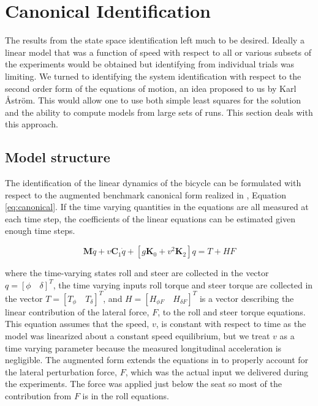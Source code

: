 \documentclass[a4paper]{article}
\begin{document}

\section{Canonical Identification}
\label{sec:canonical-identification}


The results from the state space identification left much to be desired.
Ideally a linear model that was a function of speed with respect to all or
various subsets of the experiments would be obtained but identifying from
individual trials was limiting. We turned to identifying the system
identification with respect to the second order form of the equations of
motion, an idea proposed to us by Karl Åström. This would allow one to use both
simple least squares for the solution and the ability to compute models from
large sets of runs. This section deals with this approach.

\subsection{Model structure}

The identification of the linear dynamics of the bicycle can be formulated with
respect to the augmented benchmark canonical form realized in
\cite{Meijaard2007}, Equation \ref{eq:canonical}. If the time varying
quantities in the equations are all measured at each time step, the
coefficients of the linear equations can be estimated given enough time steps.

\begin{equation}
  \mathbf{M} \ddot{q} + v \mathbf{C}_1 \dot{q} + [g \mathbf{K}_0 + v^2
  \mathbf{K}_2] q = T + H F
  \label{eq:canonical}
\end{equation}

where the time-varying states roll and steer are collected in the vector $q =
[\phi \quad \delta]^T$, the time varying inputs roll torque and steer torque
are collected in the vector $T = [T_\phi \quad T_\delta]^T$, and $H = [H_{\phi
F} \quad H_{\delta F}]^T$ is a vector describing the linear contribution of the
lateral force, $F$, to the roll and steer torque equations. This equation
assumes that the speed, $v$, is constant with respect to time as the model was
linearized about a constant speed equilibrium, but we treat $v$ as a time
varying parameter because the measured longitudinal acceleration is negligible.
The augmented form extends the equations in \cite{Meijaar2007} to properly
account for the lateral perturbation force, $F$, which was the actual input we
delivered during the experiments. The force was applied just below the seat so
most of the contribution from $F$ is in the roll equations.
\end{document}
